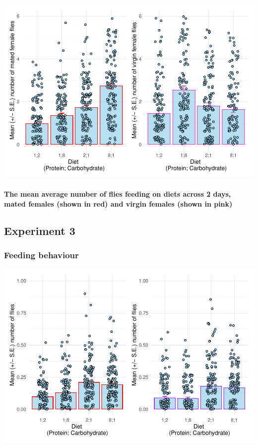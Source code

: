 \documentclass[
]{article}
\begin{document}
\includegraphics{Drosophila-project_files/figure-latex/unnamed-chunk-7-1.pdf}

\hypertarget{the-mean-average-number-of-flies-feeding-on-diets-across-2-days-mated-females-shown-in-red-and-virgin-females-shown-in-pink}{%
\paragraph{The mean average number of flies feeding on diets across 2
days, mated females (shown in red) and virgin females (shown in
pink)}\label{the-mean-average-number-of-flies-feeding-on-diets-across-2-days-mated-females-shown-in-red-and-virgin-females-shown-in-pink}}

\hypertarget{experiment-3}{%
\subsection{Experiment 3}\label{experiment-3}}

\hypertarget{feeding-behaviour-3}{%
\subsubsection{Feeding behaviour}\label{feeding-behaviour-3}}

\includegraphics{Drosophila-project_files/figure-latex/unnamed-chunk-8-1.pdf}
\end{document}
